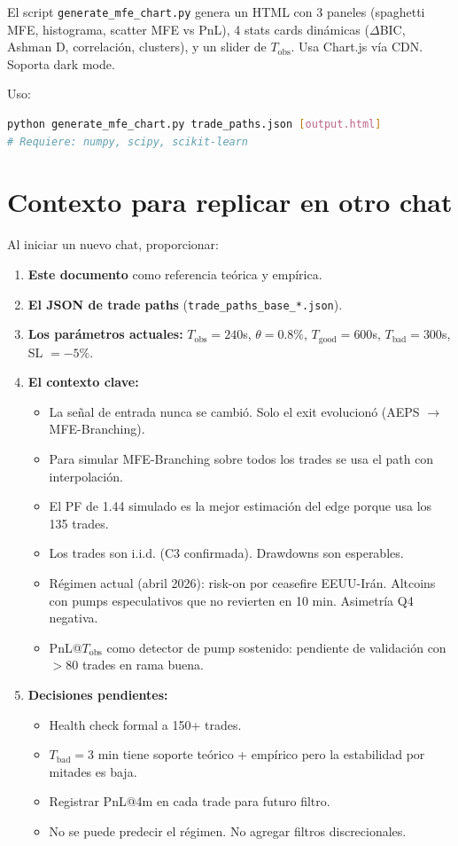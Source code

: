 \documentclass[11pt,a4paper]{article}
\begin{document}
El script \texttt{generate\_mfe\_chart.py} genera un HTML con 3 paneles (spaghetti MFE, histograma, scatter MFE vs PnL), 4 stats cards dinámicas ($\Delta$BIC, Ashman D, correlación, clusters), y un slider de $T_{\text{obs}}$. Usa Chart.js vía CDN. Soporta dark mode.
 
Uso:
\begin{lstlisting}[language=bash]
python generate_mfe_chart.py trade_paths.json [output.html]
# Requiere: numpy, scipy, scikit-learn
\end{lstlisting}
 
\section{Contexto para replicar en otro chat}
 
Al iniciar un nuevo chat, proporcionar:
 
\begin{enumerate}[leftmargin=*]
\item \textbf{Este documento} como referencia teórica y empírica.
\item \textbf{El JSON de trade paths} (\texttt{trade\_paths\_base\_*.json}).
\item \textbf{Los parámetros actuales:} $T_{\text{obs}} = 240$s, $\theta = 0.8\%$, $T_{\text{good}} = 600$s, $T_{\text{bad}} = 300$s, SL $= -5\%$.
\item \textbf{El contexto clave:}
  \begin{itemize}
    \item La señal de entrada nunca se cambió. Solo el exit evolucionó (AEPS $\to$ MFE-Branching).
    \item Para simular MFE-Branching sobre todos los trades se usa el path con interpolación.
    \item El PF de 1.44 simulado es la mejor estimación del edge porque usa los 135 trades.
    \item Los trades son i.i.d. (C3 confirmada). Drawdowns son esperables.
    \item Régimen actual (abril 2026): risk-on por ceasefire EEUU-Irán. Altcoins con pumps especulativos que no revierten en 10 min. Asimetría Q4 negativa.
    \item PnL@$T_{\text{obs}}$ como detector de pump sostenido: pendiente de validación con $>80$ trades en rama buena.
  \end{itemize}
\item \textbf{Decisiones pendientes:}
  \begin{itemize}
    \item Health check formal a 150+ trades.
    \item $T_{\text{bad}} = 3$ min tiene soporte teórico + empírico pero la estabilidad por mitades es baja.
    \item Registrar PnL@4m en cada trade para futuro filtro.
    \item No se puede predecir el régimen. No agregar filtros discrecionales.
  \end{itemize}
\end{enumerate}
 
\end{document}
